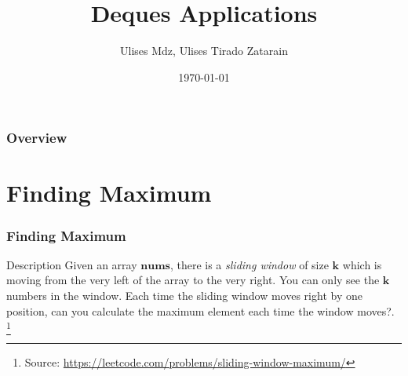 \documentclass{beamer}
\title[Deques Applications]{Deques Applications} %
\author{Ulises Mdz, Ulises Tirado Zatarain} %
\institute[UTM] %
{
Algorist Weekly Talks \\ %
\medskip
\textit{ulisesmdzmtz@gmail.com}\\ %
\textit{ulises.tirado@cimat.mx} %
}
\date{\today} %
\begin{document}
\begin{frame}
\titlepage %
\end{frame}


\begin{frame}
\frametitle{Overview} %
\tableofcontents %
\end{frame}
\section{Finding Maximum}
\begin{frame}
\frametitle{Finding Maximum}

\begin{block}{Description}
Given an array $\mathbf{nums}$, there is a \textit{sliding window} of size $\mathbf{k}$ which is moving from the very left of the array to the very right. You can only see the $\mathbf{k}$ numbers in the window. Each time the sliding window moves right by one position, can you calculate the maximum element each time the window moves?.
\footnote{Source: \url{https://leetcode.com/problems/sliding-window-maximum/}}
\end{block}
\end{frame}
\end{document}
